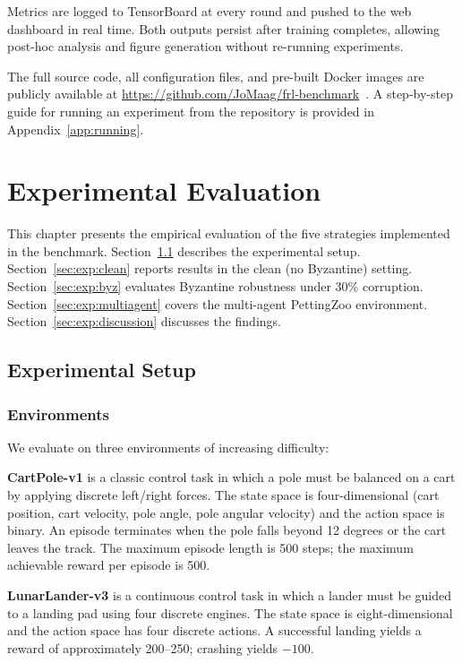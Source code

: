 \documentclass[a4paper, oneside]{discothesis}
\begin{document}
Metrics are logged to TensorBoard at every round and pushed to the web dashboard in real time. Both outputs persist after training completes, allowing post-hoc analysis and figure generation without re-running experiments.

The full source code, all configuration files, and pre-built Docker images are publicly available at \url{https://github.com/JoMaag/frl-benchmark}~\cite{FRLBenchmark}. A step-by-step guide for running an experiment from the repository is provided in Appendix~\ref{app:running}.

\chapter{Experimental Evaluation}
\label{chap:experiments}

This chapter presents the empirical evaluation of the five strategies implemented in the benchmark. Section~\ref{sec:exp:setup} describes the experimental setup. Section~\ref{sec:exp:clean} reports results in the clean (no Byzantine) setting. Section~\ref{sec:exp:byz} evaluates Byzantine robustness under 30\% corruption. Section~\ref{sec:exp:multiagent} covers the multi-agent PettingZoo environment. Section~\ref{sec:exp:discussion} discusses the findings.

\section{Experimental Setup}
\label{sec:exp:setup}

\subsection{Environments}

We evaluate on three environments of increasing difficulty:

\textbf{CartPole-v1} is a classic control task in which a pole must be balanced on a cart by applying discrete left/right forces. The state space is four-dimensional (cart position, cart velocity, pole angle, pole angular velocity) and the action space is binary. An episode terminates when the pole falls beyond 12 degrees or the cart leaves the track. The maximum episode length is 500 steps; the maximum achievable reward per episode is 500.

\textbf{LunarLander-v3} is a continuous control task in which a lander must be guided to a landing pad using four discrete engines. The state space is eight-dimensional and the action space has four discrete actions. A successful landing yields a reward of approximately 200--250; crashing yields $-100$.
\end{document}
